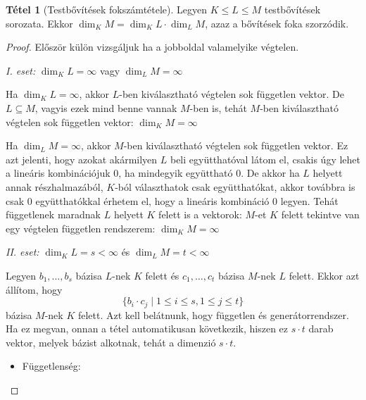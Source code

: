 \documentclass[12pt]{book}
\theoremstyle{plain} %
\theoremstyle{definition} %
\newtheorem{theo/}{Tétel}[section]
\newenvironment{theo}
  {\renewcommand{\qedsymbol}{$\clubsuit$}%
   \pushQED{\qed}\begin{theo/}}
  {\popQED\end{theo/}}
\theoremstyle{remark}
\renewcommand\qedsymbol{$\blacksquare$}
\numberwithin{equation}{section}  %
\begin{document}
	\begin{theo}[Testbővítések fokszámtétele]
		Legyen $K\leq L\leq M$ testbővítések sorozata. Ekkor $\dim_K M = \dim_K L\cdot \dim_L M$, azaz a bővítések foka szorzódik.
	\end{theo}

	\begin{proof}
		Először külön vizsgáljuk ha a jobboldal valamelyike végtelen.
		
		\textit{I. eset:} \hspace{2mm} $\dim_K L = \infty$ \hspace{2mm} vagy \hspace{2mm} $\dim_L M = \infty$
		
		Ha $\dim_K L = \infty$, akkor $L$-ben kiválasztható végtelen sok független vektor. De $L\subseteq M$, vagyis ezek mind benne vannak $M$-ben is, tehát $M$-ben kiválasztható végtelen sok független vektor: $\dim_K M = \infty$
		
		Ha $\dim_L M = \infty$, akkor $M$-ben kiválasztható végtelen sok független vektor. Ez azt jelenti, hogy azokat akármilyen $L$ beli együtthatóval látom el, csakis úgy lehet a lineáris kombinációjuk $0$, ha mindegyik együttható $0$. De akkor ha $L$ helyett annak részhalmazából, $K$-ból választhatok csak együtthatókat, akkor továbbra is csak $0$ együtthatókkal érhetem el, hogy a lineáris kombináció $0$ legyen. Tehát függetlenek maradnak $L$ helyett $K$ felett is a vektorok: $M$-et $K$ felett tekintve van egy végtelen független rendszerem: $\dim_K M = \infty$
		
		\textit{II. eset:} \hspace{2mm} $\dim_K L = s<\infty$ \hspace{2mm} és \hspace{2mm} $\dim_L M = t<\infty$
		
		Legyen $b_1,\ldots,b_s$ bázisa $L$-nek $K$ felett és $c_1,\ldots,c_t$ bázisa $M$-nek $L$ felett. Ekkor azt állítom, hogy
		\[ \{ b_i\cdot c_j \mid 1\leq i\leq s, 1\leq j\leq t  \}  \]
		bázisa $M$-nek $K$ felett. Azt kell belátnunk, hogy független és generátorrendszer. Ha ez megvan, onnan a tétel automatikusan következik, hiszen ez $s\cdot t$ darab vektor, melyek bázist alkotnak, tehát a dimenzió $s\cdot t$.
		
		\begin{itemize}
			\item {Függetlenség:
			
}
\end{itemize}
\end{proof}
\end{document}
